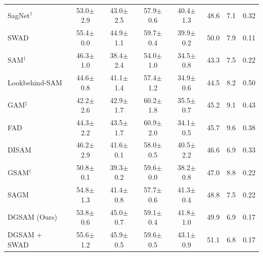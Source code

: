 \documentclass{article}
\theoremstyle{plain}
\theoremstyle{definition}
\theoremstyle{remark}
\begin{document}
\begin{table}[!ht]
\begin{tabular}{l|cccc|ccc}
SagNet\(^\dag\) \cite{nam2021sagnet}         & {53.0\scriptsize$\pm$2.9} & {43.0\scriptsize$\pm$2.5} & {57.9\scriptsize$\pm$0.6} & {40.4\scriptsize$\pm$1.3} & 48.6 & 7.1 & 0.32 \\
SWAD \cite{cha2021swad}         & {55.4\scriptsize$\pm$0.0} & {44.9\scriptsize$\pm$1.1} & {59.7\scriptsize$\pm$0.4} & {39.9\scriptsize$\pm$0.2} & 50.0 & 7.9 & 0.11 \\ \midrule
SAM\(^\dag\) \cite{foret2021sam}         & {46.3\scriptsize$\pm$1.0} & {38.4\scriptsize$\pm$2.4} & {54.0\scriptsize$\pm$1.0} & {34.5\scriptsize$\pm$0.8} & 43.3 & 7.5 & 0.22 \\
Lookbehind-SAM \cite{mordido2024lookbehind}         & {44.6\scriptsize$\pm$0.8} & {41.1\scriptsize$\pm$1.4} & {57.4\scriptsize$\pm$1.2} & {34.9\scriptsize$\pm$0.6} & 44.5 & 8.2 & 0.50 \\
GAM\(^\ddag\) \cite{zhang2023gam}         & {42.2\scriptsize$\pm$2.6} & {42.9\scriptsize$\pm$1.7} & {60.2\scriptsize$\pm$1.8} & {35.5\scriptsize$\pm$0.7} & 45.2 & 9.1 & 0.43 \\
FAD \cite{zhang2023fad}         & {44.3\scriptsize$\pm$2.2} & {43.5\scriptsize$\pm$1.7} & {60.9\scriptsize$\pm$2.0} & {34.1\scriptsize$\pm$0.5} & 45.7 & 9.6 & 0.38 \\
DISAM \cite{zhang2024disam}         & {46.2\scriptsize$\pm$2.9} & {41.6\scriptsize$\pm$0.1} & {58.0\scriptsize$\pm$0.5} & {40.5\scriptsize$\pm$2.2} & 46.6 & 6.9 & 0.33 \\
GSAM\(^\dag\) \cite{zhuang2022gsam}         & {50.8\scriptsize$\pm$0.1} & {39.3\scriptsize$\pm$0.2} & {59.6\scriptsize$\pm$0.0} & {38.2\scriptsize$\pm$0.8} & 47.0 & 8.8 & 0.22 \\
SAGM \cite{wang2023sagm}         & {54.8\scriptsize$\pm$1.3} & {41.4\scriptsize$\pm$0.8} & {57.7\scriptsize$\pm$0.6} & {41.3\scriptsize$\pm$0.4} & 48.8 & 7.5 & 0.22 \\
DGSAM (Ours)         & {53.8\scriptsize$\pm$0.6} & {45.0\scriptsize$\pm$0.7} & {59.1\scriptsize$\pm$0.4} & {41.8\scriptsize$\pm$1.0} & 49.9 & 6.9 & 0.17 \\ 
DGSAM + SWAD         & {55.6\scriptsize$\pm$1.2} & {45.9\scriptsize$\pm$0.5} & {59.6\scriptsize$\pm$0.5} & {43.1\scriptsize$\pm$0.9} & 51.1 & 6.8 & 0.17 \\ \bottomrule
\end{tabular}
\end{table}
\end{document}
